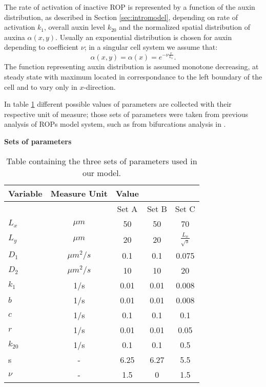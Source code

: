 The rate of activation of inactive ROP is represented by a function of the auxin distribution, as described in Section \ref{sec:intromodel}, depending on rate of activation $k_1$, overall auxin level $k_{20}$ and the normalized spatial distribution of auxina $\alpha(x,y)$. Usually an exponential distribution is chosen for auxin depending to coefficient $\nu$; in a singular cell system we assume that:
\begin{equation}\label{eq:alpha_exp}
  \alpha(x,y) = \alpha(x) = e^{-\nu \frac{x}{L_x}}.
\end{equation}
The function representing auxin distribution is assumed monotone decreasing, at steady state with maximum located in correspondance to the left boundary of the cell and to vary only in $x$-direction.

In table \ref{tab:setprm} different possible values of parameters are collected with their respective unit of measure; those sets of parameters were taken from previous analysis of ROPs model system, such as from bifurcations analysis in \cite{intra2}.

\begin{table}
    \caption*{\textbf{Sets of parameters}}
    \centering
    \begin{tabular}{|p{7em} |c| c c c|}
    \hline
    \rowcolor{bluepoli!40} %
    \textbf{Variable} & \textbf{Measure Unit} & \textbf{Value} & & \T\B \\
    \hline \hline
     &  & Set A & Set B & Set C \T\B\\
    $L_x$ & $\mu m $ & 50 & 50 & 70 \T\B\\
    $L_y$ & $\mu m $ & 20 & 20 & $\frac{L_x}{\sqrt{s}}$\T\B\\
    $D_1$ & $\mu m^2 /s $ & 0.1 & 0.1 & 0.075\T\B\\
    $D_2$ & $\mu m^2 /s $ & 10 & 10 & 20\T\B\\
    $k_1$ & 1/s & 0.01 & 0.01 & 0.008\T\B\\
    $b$ & 1/s & 0.01 & 0.01 & 0.008 \T\B\\
    $c$ & 1/s & 0.1 & 0.1 & 0.1 \T\B\\
    $r$ & 1/s & 0.01 & 0.01 & 0.05 \T\B\\
    $k_{20}$ & 1/s & 0.1 & 0.1 & 0.5 \T\B\\
    s & -  & 6.25 & 6.27 & 5.5 \T\B\\
    $\nu$ & - & 1.5 & 0 & 1.5 \T\B\\
    \hline
    \end{tabular}
    \\[10pt]
    \caption{Table containing the three sets of parameters used in our model.}
    \label{tab:setprm}
\end{table}

